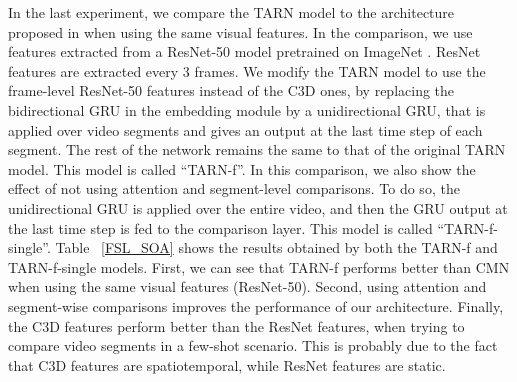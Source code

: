 In the last experiment, we compare the TARN model to the architecture proposed in \cite{zhu_18_compound} when using the same visual features. In the comparison, we use features extracted from a ResNet-50 \cite{he_16_resnet} model pretrained on ImageNet \cite{russakovsky_15_imagenet}. ResNet features are extracted every 3 frames. We modify the TARN model to use the frame-level ResNet-50 features instead of the C3D ones, by replacing the bidirectional GRU in the embedding module by a unidirectional GRU, that is applied over video segments and gives an output at the last time step of each segment. The rest of the network remains the same to that of the original TARN model. This model is called  ``TARN-f''. In this comparison, we also show the effect of not using attention and segment-level comparisons. To do so, the unidirectional GRU is applied over the entire video, and then the GRU output at the last time step is fed to the comparison layer. This model is called ``TARN-f-single''. Table ~\ref{FSL_SOA} shows the results obtained by both the TARN-f and TARN-f-single models. First, we can see that TARN-f performs better than CMN \cite{zhu_18_compound} when using the same visual features (ResNet-50). Second, using attention and segment-wise comparisons improves the performance of our architecture. Finally, the C3D features perform better than the ResNet features, when trying to compare video segments in a few-shot scenario. This is probably due to the fact that C3D features are spatiotemporal, while ResNet features are static. 







